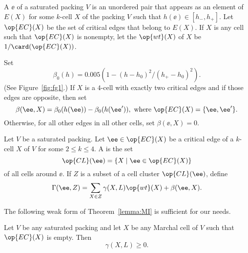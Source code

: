 \begin{definition}\label{def:wt} 
  A  $\ee$ of a saturated packing $V$ is an
  unordered pair that appears as an element of $E(X)$ for some
  $k$-cell $X$ of the packing $V$ such that $h(\ee)\in[h_-,h_+]$.  Let
  $\op{EC}(X)$ be the set of critical edges that belong to $E(X)$.  If
  $X$ is any cell such that $\op{EC}(X)$ is nonempty, let the
   $\op{wt}(X)$ of $X$ be $1/\card(\op{EC}(X))$.
\end{definition}
%
%
%

\begin{definition}\label{def:beta} 
Set 
\[  
\beta_0(h) = 0.005 (1 - (h-h_0)^2/(h_+-h_0)^2).
\] 
 (See Figure~\ref{fig:fg1}.) 
If $X$ is a $4$-cell with exactly two critical edges and if those
edges are opposite, then set
\[  
\beta(\ee,X) = \beta_0(h(\ee)) - \beta_0(h(\ee')), 
\text{ where }\op{EC}(X) = \{\ee,\ee'\} .  
\] 
Otherwise, for all other edges in all other cells, set $\beta(\ee,X) = 0$.
\end{definition}
%
%

\figPQFEXQN %

\begin{definition}
\label{def:gammaL} 
  Let $V$ be a saturated packing.  Let $\ee\in \op{EC}(X)$ be a
  critical edge of a $k$-cell $X$ of $V$ for some $2\le k\le 4$.  A
   is the set
\[  
\op{CL}(\ee) = \{X\mid \ee\in \op{EC}(X)\} 
\] 
%
of all cells around $\ee$. 
If $Z$ is a subset of a cell cluster $\op{CL}(\ee)$, define
%
\[  
\Gamma(\ee,Z) = \sum_{X\in Z} \gamma(X,L) \op{wt}(X) +\beta(\ee,X).
\] 
%
\end{definition}
%

The following weak form of Theorem~\ref{lemma:MI} is sufficient
for our needs.

\begin{lemma}\label{lemma:LI} 
Let $V$ be any saturated packing and let $X$ be any Marchal cell of $V$ such that $\op{EC}(X)$ is empty.   Then
\[
\gamma(X,L)\ge 0.
\]
\end{lemma}

